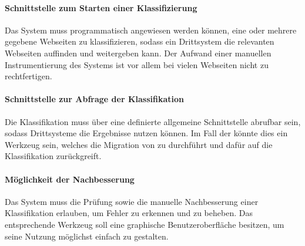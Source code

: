         \paragraph*{Schnittstelle zum Starten einer Klassifizierung}      
        Das System muss programmatisch angewiesen werden können,
        eine oder mehrere gegebene Webseiten zu klassifizieren,
        sodass ein Drittsystem die relevanten Webseiten auffinden
        und weitergeben kann.
        Der Aufwand einer manuellen Instrumentierung des Systems ist
        vor allem bei vielen Webseiten nicht zu rechtfertigen.

        \paragraph*{Schnittstelle zur Abfrage der Klassifikation}
        Die Klassifikation muss über eine definierte allgemeine
        Schnittstelle abrufbar sein, sodass Drittsysteme die Ergebnisse
        nutzen können.
        Im Fall der {\fernUni} könnte dies ein Werkzeug sein,
        welches die Migration von {\wordpress} zu {\imperia}
        durchführt und dafür auf die Klassifikation zurückgreift.

        \paragraph*{Möglichkeit der Nachbesserung}
        Das System muss die Prüfung sowie die manuelle Nachbesserung
        einer Klassifikation erlauben,
        um Fehler zu erkennen und zu beheben.
        Das entsprechende Werkzeug soll eine graphische Benutzeroberfläche
        besitzen, um seine Nutzung möglichst einfach zu gestalten.
